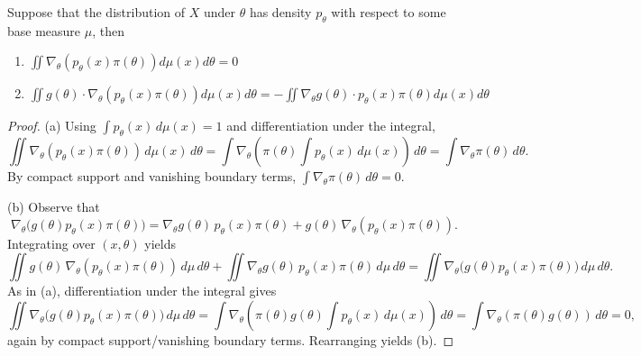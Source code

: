 \begin{lem}Suppose that the distribution of $X$ under $\theta$ has density $p_\theta$ with respect to some base measure $\mu$, then
\begin{enumerate}
    \item $\iint \nabla_{\theta} (p_{\theta}(x) \pi(\theta))d\mu(x) d\theta = 0$
    \item $\iint g(\theta) \cdot \nabla_{\theta} (p_{\theta}(x) \pi(\theta))d\mu(x) d\theta = - \iint \nabla_{\theta} g(\theta) \cdot p_{\theta}(x) \pi(\theta)d\mu(x) d\theta$
\end{enumerate}


\end{lem}
\begin{proof}
(a) Using $\int p_\theta(x)\,d\mu(x)=1$ and differentiation under the integral,
\[
\iint \nabla_\theta(p_\theta(x)\pi(\theta))\,d\mu(x)\,d\theta
= \int \nabla_\theta\!\left(\pi(\theta)\int p_\theta(x)\,d\mu(x)\right)\,d\theta
= \int \nabla_\theta \pi(\theta)\,d\theta.
\]
By compact support and vanishing boundary terms, $\int \nabla_\theta\pi(\theta)\,d\theta=0$.

(b) Observe that
\[
\nabla_\theta\!\big(g(\theta)p_\theta(x)\pi(\theta)\big)
= \nabla_\theta g(\theta)\,p_\theta(x)\pi(\theta) + g(\theta)\,\nabla_\theta(p_\theta(x)\pi(\theta)).
\]
Integrating over $(x,\theta)$ yields
\[
\iint g(\theta)\,\nabla_\theta(p_\theta(x)\pi(\theta))\,d\mu\,d\theta
+ \iint \nabla_\theta g(\theta)\,p_\theta(x)\pi(\theta)\,d\mu\,d\theta
= \iint \nabla_\theta\!\big(g(\theta)p_\theta(x)\pi(\theta)\big)\,d\mu\,d\theta.
\]
As in (a), differentiation under the integral gives
\[
\iint \nabla_\theta\!\big(g(\theta)p_\theta(x)\pi(\theta)\big)\,d\mu\,d\theta
= \int \nabla_\theta\!\left(\pi(\theta)g(\theta)\int p_\theta(x)\,d\mu(x)\right)\,d\theta
= \int \nabla_\theta(\pi(\theta)g(\theta))\,d\theta = 0,
\]
again by compact support/vanishing boundary terms. Rearranging yields (b).
\end{proof}


